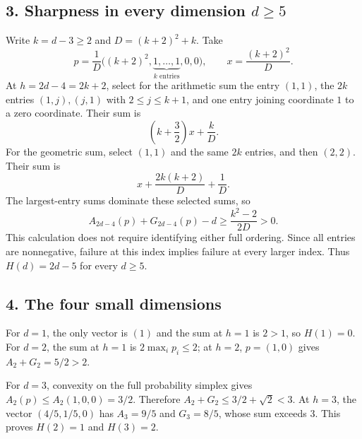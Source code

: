 \documentclass[11pt]{article}
\begin{document}
\subsection*{3. Sharpness in every dimension $d\ge5$}
Write $k=d-3\ge2$ and $D=(k+2)^2+k$. Take
\begin{equation}\label{counter}
 p=\frac1D\big((k+2)^2,\underbrace{1,\ldots,1}_{k\text{ entries}},0,0\big),
 \qquad x=\frac{(k+2)^2}{D}.
\end{equation}
At $h=2d-4=2k+2$, select for the arithmetic sum the entry
$(1,1)$, the $2k$ entries $(1,j),(j,1)$ with $2\le j\le k+1$,
and one entry joining coordinate $1$ to a zero coordinate. Their sum is
\[
 \left(k+\frac32\right)x+\frac{k}{D}.
\]
For the geometric sum, select $(1,1)$ and the same $2k$ entries,
and then $(2,2)$. Their sum is
\[
 x+\frac{2k(k+2)}D+\frac1D.
\]
The largest-entry sums dominate these selected sums, so
\begin{equation}\label{gap}
 A_{2d-4}(p)+G_{2d-4}(p)-d
 \ge\frac{k^2-2}{2D}>0.
\end{equation}
This calculation does not require identifying either full ordering.
Since all entries are nonnegative, failure at this index implies
failure at every larger index. Thus $H(d)=2d-5$ for every $d\ge5$.

\subsection*{4. The four small dimensions}
For $d=1$, the only vector is $(1)$ and the sum at $h=1$ is $2>1$,
so $H(1)=0$. For $d=2$, the sum at $h=1$ is $2\max_i p_i\le2$;
at $h=2$, $p=(1,0)$ gives $A_2+G_2=5/2>2$.

For $d=3$, convexity on the full probability simplex gives
$A_2(p)\le A_2(1,0,0)=3/2$. Therefore
$A_2+G_2\le3/2+\sqrt2<3$. At $h=3$, the vector $(4/5,1/5,0)$
has $A_3=9/5$ and $G_3=8/5$, whose sum exceeds $3$.
This proves $H(2)=1$ and $H(3)=2$.
\end{document}

